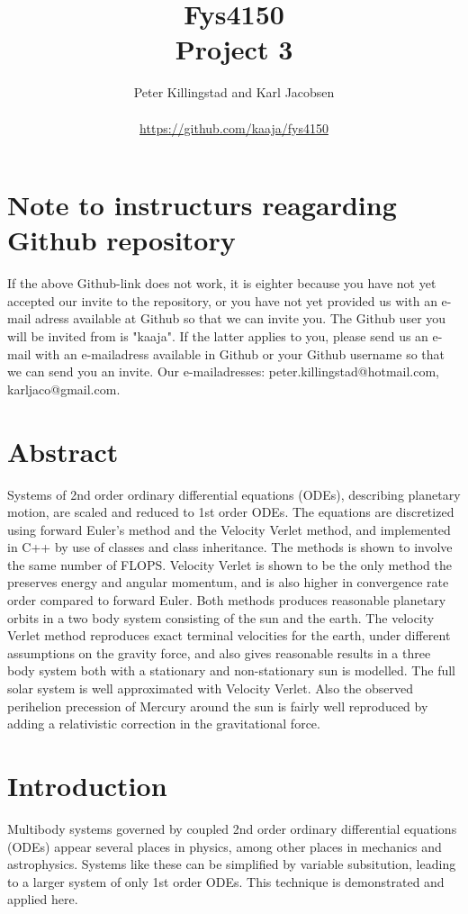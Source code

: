 \documentclass{article}
\title{Fys4150\\Project 3\\ }
\author{Peter Killingstad and Karl Jacobsen\\
\\
\url{https://github.com/kaaja/fys4150}}
\begin{document}
	
\maketitle



\section*{Note to instructurs reagarding Github repository}
If the above Github-link does not work, it is eighter because you have not yet accepted our invite to the repository, or you have not yet provided us with an e-mail adress available at Github so that we can invite you. The Github user you will be invited from is "kaaja". If the latter applies to you, please send us an e-mail with an e-mailadress available in Github or your Github username so that we can send you an invite. Our e-mailadresses: peter.killingstad@hotmail.com, karljaco@gmail.com.



\section*{Abstract}
Systems of 2nd order ordinary differential equations (ODEs), describing planetary motion, are scaled and reduced to 1st order ODEs. The equations are discretized using forward Euler's method and the Velocity Verlet method, and implemented in C++ by use of classes and class inheritance. The methods is shown to involve the same number of FLOPS. Velocity Verlet is shown to be the only method the preserves energy and angular momentum, and is also higher in convergence rate order compared to forward Euler. Both methods produces reasonable planetary orbits in a two body system consisting of the sun and the earth. The velocity Verlet method reproduces exact terminal velocities for the earth, under different assumptions on the gravity force, and also gives reasonable results in a three body system both with a stationary and non-stationary sun is modelled. The full solar system is well approximated with Velocity Verlet. Also the observed perihelion precession of Mercury around the sun is fairly well reproduced by adding a relativistic correction in the gravitational force.


\section{Introduction}
Multibody systems governed by coupled 2nd order ordinary differential equations (ODEs) appear several places in physics, among other places in mechanics and astrophysics. Systems like these can be simplified by variable subsitution, leading to a larger system of only 1st order ODEs. This technique is demonstrated and applied here.\\
\end{document}
